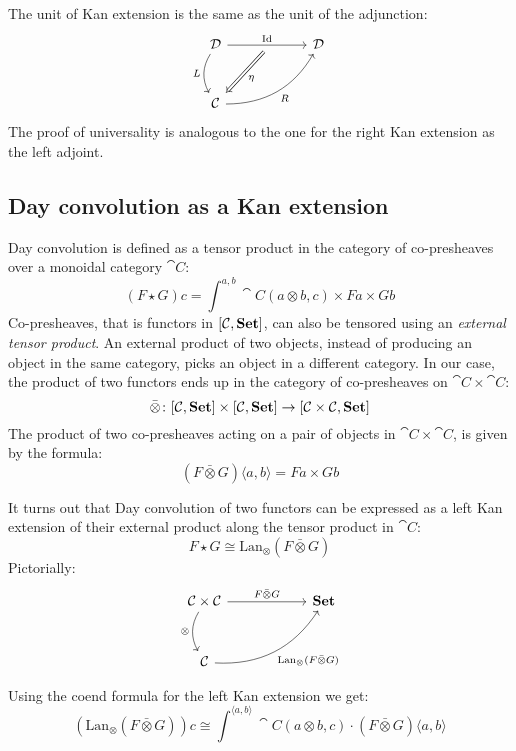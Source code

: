 \documentclass[DaoFP]{subfiles}
\begin{document}
The unit of Kan extension is the same as the unit of the adjunction:
\[
 \begin{tikzcd} [row sep=1cm, column sep=1cm]
 \cat D
 \arrow[rr, "\text{Id}", "" {name=ID, below} ]
 \arrow[d, bend right, "L"']
 && \cat D
 \\
 \cat C
  \arrow[urr, bend right, "R"']
 \arrow[Rightarrow, "\eta",  from=ID]
 \end{tikzcd}
\]
The proof of universality is analogous to the one for the right Kan extension as the left adjoint.

\subsection{Day convolution as a Kan extension}

Day convolution is defined as a tensor product in the category of co-presheaves over a monoidal category $\cat C$:
\[ (F \star G) c = \int^{a, b} \cat C (a \otimes b, c) \times F a \times G b \]
Co-presheaves, that is functors in $[\mathcal{C}, \mathbf{Set}]$, can also be tensored using an \emph{external tensor product}. An external product of two objects, instead of producing an object in the same category, picks an object in a different category. In our case, the product of two functors ends up in the category of co-presheaves on $\cat C \times \cat C$:
\[ \bar{\otimes} \colon [\mathcal{C}, \mathbf{Set}] \times [\mathcal{C}, \mathbf{Set}] \to [\mathcal{C} \times \mathcal{C}, \mathbf{Set}] \]
The product of two co-presheaves acting on a pair of objects in $\cat C \times \cat C$, is given by the formula:
\[ (F \bar{\otimes} G)\langle a, b \rangle = F a \times G b \]

It turns out that Day convolution of two functors can be expressed as a left Kan extension of their external product along the tensor product in $\cat C$:
\[ F \star G \cong \text{Lan}_{\otimes} (F \bar{ \otimes } G) \]
Pictorially:
\[
 \begin{tikzcd} [row sep=1cm, column sep=1cm]
 \cat C \times \cat C
 \arrow[rr, "F \bar{\otimes} G", "" {name=ID, below} ]
 \arrow[d, bend right, "\otimes"']
 && \Set
 \\
 \cat C
  \arrow[urr, bend right, "\text{Lan}_{\otimes} (F \bar{ \otimes } G)"']
 \end{tikzcd}
\]

Using the coend formula for the left Kan extension we get:
\[ (\text{Lan}_{\otimes} (F \bar{ \otimes } G)) c \cong \int^{\langle a, b\rangle} \cat C ( a \otimes b, c) \cdot (F \bar{ \otimes } G)\langle a, b\rangle\]
\end{document}
